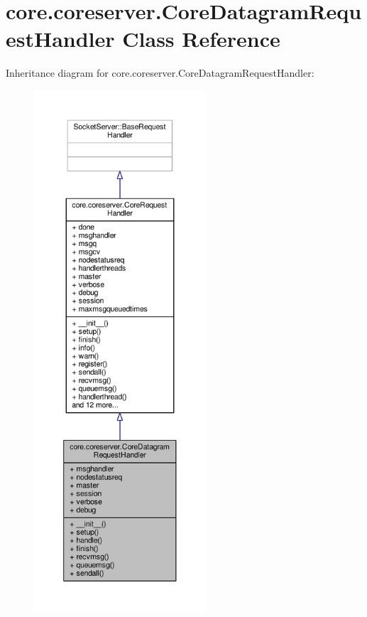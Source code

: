 \hypertarget{classcore_1_1coreserver_1_1_core_datagram_request_handler}{\section{core.\+coreserver.\+Core\+Datagram\+Request\+Handler Class Reference}
\label{classcore_1_1coreserver_1_1_core_datagram_request_handler}
}


Inheritance diagram for core.\+coreserver.\+Core\+Datagram\+Request\+Handler\+:
\nopagebreak
\begin{figure}[H]
\begin{center}
\leavevmode
\includegraphics[height=550pt]{classcore_1_1coreserver_1_1_core_datagram_request_handler__inherit__graph}
\end{center}
\end{figure}


